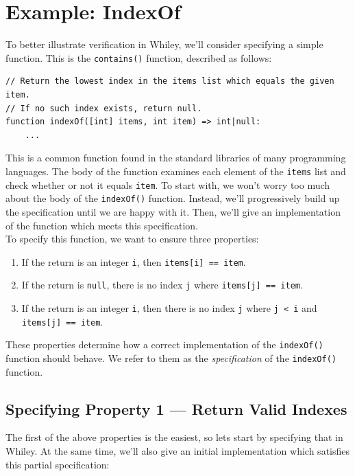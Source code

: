 \newpage
\section{Example: IndexOf}

To better illustrate verification in Whiley, we'll consider specifying a simple function.  This is the \lstinline{contains()} function, described as follows:

\begin{lstlisting}
// Return the lowest index in the items list which equals the given item.
// If no such index exists, return null.
function indexOf([int] items, int item) => int|null:
    ...
\end{lstlisting}

This is a common function found in the standard libraries of many
programming languages.  The body of the function examines each element
of the \lstinline{items} list and check whether or not it equals
\lstinline{item}.  To start with, we won't worry too much about the
body of the \lstinline{indexOf()} function.  Instead, we'll
progressively build up the specification until we are happy with it.
Then, we'll give an implementation of the function which meets this
specification.\\

\noindent To specify this function, we want to ensure three properties:

\begin{enumerate}
\item If the return is an integer \lstinline{i}, then
  \lstinline{items[i] == item}.
\item If the return is \lstinline{null}, there is no index
  \lstinline{j} where \lstinline{items[j] == item}.
\item If the return is an integer \lstinline{i}, then there is
  no index \lstinline{j} where \lstinline{j < i} and
  \lstinline{items[j] == item}.
\end{enumerate}

These properties determine how a correct implementation of the
\lstinline{indexOf()} function should behave.  We refer to them as the
{\em specification} of the \lstinline{indexOf()} function.

\subsection{Specifying Property 1 --- Return Valid Indexes}

The first of the above properties is the easiest, so lets start by
specifying that in Whiley.  At the same time, we'll also give an
initial implementation which satisfies this partial specification:

